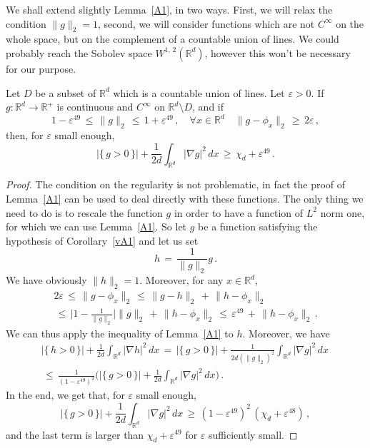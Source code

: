 \documentclass[AHL, Unicode, longabstracts, published]{cedram}
\newcommand*\Rd {{\mathbb R^d}}
\newcommand*\R{\mathbb{R}}
\let\oldforall\forall
\renewcommand*{\forall}{\mathrel{\oldforall}}
\begin{document}
We shall extend slightly Lemma~\ref{A1}, in two ways. First, we will relax the condition $\|g\|_2=1$, second, we will consider functions which are not $C^\infty$ on the whole space, but on the complement of a countable union of lines. We could probably reach the Sobolev space $W^{1,\,2}(\Rd)$, however this won't be necessary for our purpose.
\begin{coro}\label{vA1}
Let $D$ be a subset of $\Rd$ which is a countable union of lines. Let $\varepsilon>0$. If $g:\Rd\to\R^+$ is continuous and $C^\infty$ on $\Rd\setminus D$, and if
\[
1-\varepsilon^{49}\,\leq\,\|g\|_2\,\leq\,1 +\varepsilon^{49}\,,\quad
\forall{x\in\Rd}\quad\|g-\phi_x\|_2\,\geq\,2\varepsilon\,,
\]
then, for $\varepsilon$ small enough,
\[
\big|\{\,g>0\,\}\big|+\frac{1}{2d}
\int_{\Rd}\big|\nabla g\big|^2\,dx\,\geq\,\chi_d+\varepsilon^{49}\,.
\]
\end{coro}
\begin{proof}
The condition on the regularity is not problematic, in fact the proof of Lemma~\ref{A1} can be used to deal directly with these functions. The only thing we need to do is to rescale the function $g$ in order to have a function of $L^2$ norm one, for which we can use Lemma~\ref{A1}. So let $g$ be a function satisfying the hypothesis of Corollary~\ref{vA1} and let us set
\[
h\,=\,\frac{1}{\|g\|_2}g\,.
\]
We have obviously $\|h\|_2=1$. Moreover, for any $x\in \Rd$,
\begin{multline*}
2\varepsilon\,\leq\, \|g-\phi_x\|_2\,\leq\, \|g-h\|_2\,+\, \|h-\phi_x\|_2
\\ \,\leq\,
\Big|1-
\frac{1}{\|g\|_2}\Big| \|g\|_2
\,+\, \|h-\phi_x\|_2
\,\leq\,
\varepsilon^{49}
\,+\, \|h-\phi_x\|_2\,.
\end{multline*}
We can thus apply the inequality of Lemma~\ref{A1} to $h$. Moreover, we have
\begin{multline*}
\big|\{\,h>0\,\}\big|+\frac{1}{2d}
\int_{\Rd}\big|\nabla h\big|^2\,dx\,=\,
\big|\{\,g>0\,\}\big|+\frac{1}{2d (\|g\|_2)^2 }
\int_{\Rd}\big|\nabla g\big|^2\,dx\,
\\
\,\leq\,
\frac{1}{(1-\varepsilon^{49})^2}\Big(
\big|\{\,g>0\,\}\big|+\frac{1}{2d }
\int_{\Rd}\big|\nabla g\big|^2\,dx\Big)\,.
\end{multline*}
In the end, we get that, for $\varepsilon$ small enough,
\[
\big|\{\,g>0\,\}\big|+\frac{1}{2d }
\int_{\Rd}\big|\nabla g\big|^2\,dx\,\geq\, \left(1-\varepsilon^{49}\right)^2\,\left(\chi_d+\varepsilon^{48}\right)\,,
\]
and the last term is larger than $\chi_d+\varepsilon^{49}$ for $\varepsilon$ sufficiently small.
\end{proof}
\end{document}
